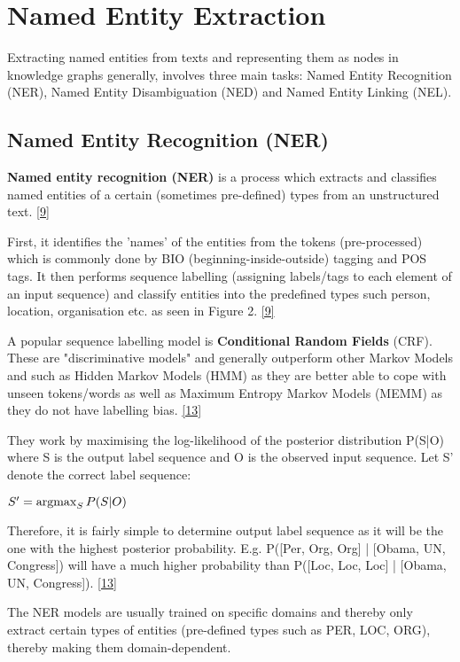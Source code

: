 \section{Named Entity Extraction} 

Extracting named entities from texts and representing them as nodes in knowledge graphs generally, involves three main
tasks: Named Entity Recognition (NER), Named Entity Disambiguation (NED) and Named Entity Linking (NEL). 

\subsection{Named Entity Recognition (NER)} \label{named_ents}

\textbf{Named entity recognition (NER)} is a process which extracts and classifies named entities of a certain (sometimes pre-defined) types
from an unstructured text. \hyperlink{9}{[9]} 

First, it identifies the 'names' of the entities from the tokens (pre-processed) which is commonly done by BIO (beginning-inside-outside) tagging and POS tags. It then performs sequence labelling (assigning labels/tags to each element of an input sequence) and classify entities into the predefined types such person, location, organisation etc. as seen in Figure 2. \hyperlink{9}{[9]}

A popular sequence labelling model is \textbf{Conditional Random Fields }(CRF). These are "discriminative models" and generally outperform other Markov Models and such as Hidden Markov Models (HMM) as they are better able to cope with unseen tokens/words as well as Maximum Entropy Markov Models (MEMM) as they do not have labelling bias. \hyperlink{13}{[13]}

They work by maximising the log-likelihood of the posterior distribution P(S|O) where S is  the output label sequence and O is the observed input sequence. Let S' denote the correct label sequence: 

$ S' = \operatorname*{argmax}_{S} P (S|O) $

Therefore, it is fairly simple to determine output label sequence as it will be the one with the highest posterior probability. E.g. P([Per, Org, Org] | [Obama, UN, Congress]) will have a much higher probability than  P([Loc, Loc, Loc] | [Obama, UN, Congress]). \hyperlink{13}{[13]} 

The NER models are usually trained on specific domains and thereby only extract certain types of entities (pre-defined types such as PER, LOC, ORG), thereby making them domain-dependent.



